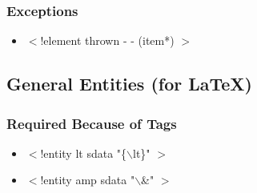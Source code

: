 \subsubsection{Exceptions}
\begin{itemize}
\item
$<$!element thrown - - (item*) $>$
\end{itemize}

\subsection{General Entities (for \LaTeX)}
\subsubsection{Required Because of Tags}
\begin{itemize}
\item
$<$!entity lt sdata "\{$\backslash$lt\}" $>$
\item
$<$!entity amp sdata "$\backslash$\&" $>$
\end{itemize}
